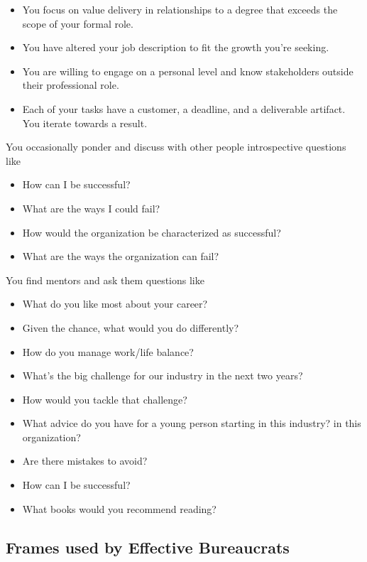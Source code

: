 \begin{itemize}
    \item You focus on value delivery in relationships to a degree that exceeds the scope of your formal role.
\item You have altered your job description to fit the growth you're seeking.
\item You are willing to engage on a personal level and know stakeholders outside their professional role.
\item Each of your tasks have a customer, a deadline, and a deliverable artifact. You iterate towards a result. 
\end{itemize}

You occasionally ponder and discuss with other people introspective questions like
\begin{itemize}
    \item How can I be successful?
    \item What are the ways I could fail?
    \item How would the organization be characterized as successful?
    \item What are the ways the organization can fail?
\end{itemize}
You find mentors and ask them questions like
\begin{itemize}
    \item What do you like most about your career? 
    \item Given the chance, what would you do differently?
    \item How do you manage work/life balance?
    \item What's the big challenge for our industry in the next two years?
    \item How would you tackle that challenge?
    \item What advice do you have for a young person starting in this industry? in this organization? \item Are there mistakes to avoid?  
    \item How can I be successful?
    \item What books would you recommend reading?
\end{itemize}

\subsection*{Frames used by Effective Bureaucrats}

